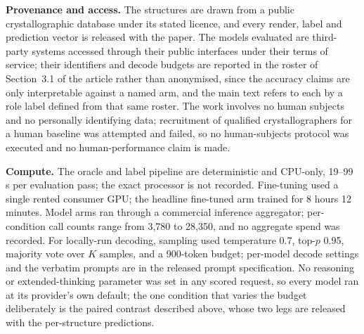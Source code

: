 \textbf{Provenance and access.} The structures are drawn from a public crystallographic database under its
stated licence, and every render, label and prediction vector is released with the paper. The models
evaluated are third-party systems accessed through their public interfaces under their terms of service;
their identifiers and decode budgets are reported in the roster of Section~3.1 of the article rather than
anonymised, since the accuracy claims are only interpretable against a named arm, and the main text refers
to each by a role label defined from that same roster. The work involves no human subjects and no personally
identifying data; recruitment of qualified crystallographers for a human baseline was attempted and failed,
so no human-subjects protocol was executed and no human-performance claim is made.

\textbf{Compute.} The oracle and label pipeline are deterministic and CPU-only, 19--99 s per evaluation
pass; the exact processor is not recorded. Fine-tuning used a single rented consumer GPU; the headline
fine-tuned arm trained for 8 hours 12 minutes. Model arms ran through a commercial inference aggregator;
per-condition call counts range from 3{,}780 to 28{,}350, and no aggregate spend was recorded. For
locally-run decoding, sampling used temperature 0.7, top-$p$ 0.95, majority vote over $K$ samples, and a
900-token budget; per-model decode settings and the verbatim prompts are in the released prompt
specification. No reasoning
or extended-thinking parameter was set in any scored request, so every model ran at its provider's own
default; the one condition that varies the budget deliberately is the paired contrast described above, whose
two legs are released with the per-structure predictions.
